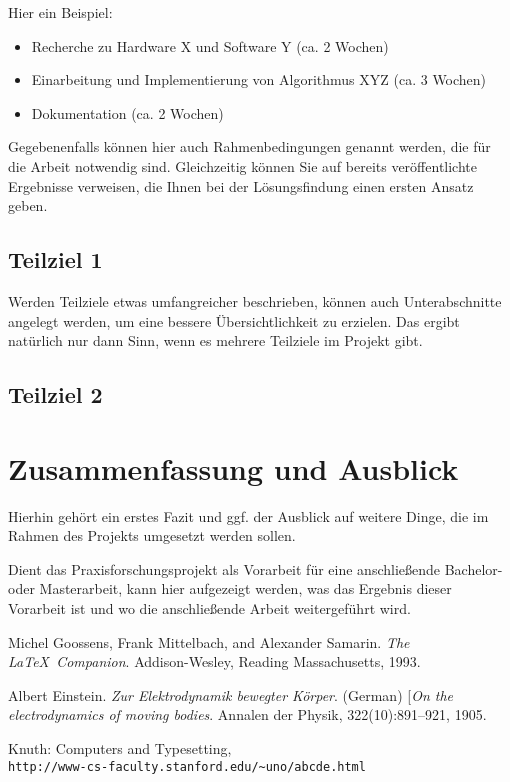 \documentclass[
  a4paper,	      %
	11pt,           %
  parskip=half*,  %
]{scrartcl}
\begin{document}
Hier ein Beispiel:

\begin{itemize}\tightlist
    \item Recherche zu Hardware X und Software Y (ca. 2 Wochen)
    \item Einarbeitung und Implementierung von Algorithmus XYZ (ca. 3 Wochen)
    \item Dokumentation (ca. 2 Wochen)
\end{itemize}

Gegebenenfalls können hier auch Rahmenbedingungen genannt werden, die für die Arbeit notwendig sind. Gleichzeitig können Sie auf bereits veröffentlichte Ergebnisse verweisen, die Ihnen bei der Lösungsfindung einen ersten Ansatz geben.

\subsection{Teilziel 1}
Werden Teilziele etwas umfangreicher beschrieben, können auch Unterabschnitte angelegt werden, um eine bessere Übersichtlichkeit zu erzielen. Das ergibt natürlich nur dann Sinn, wenn es mehrere Teilziele im Projekt gibt.

\subsection{Teilziel 2}

\section{Zusammenfassung und Ausblick}
Hierhin gehört ein erstes Fazit und ggf. der Ausblick auf weitere Dinge, die im Rahmen des Projekts umgesetzt werden sollen.

Dient das Praxisforschungsprojekt als Vorarbeit für eine anschließende Bachelor- oder Masterarbeit, kann hier aufgezeigt werden, was das Ergebnis dieser Vorarbeit ist und wo die anschließende Arbeit weitergeführt wird.

\begin{thebibliography}{1}

Michel Goossens, Frank Mittelbach, and Alexander Samarin. \textit{The \LaTeX\ Companion}. Addison-Wesley, Reading Massachusetts, 1993.

 Albert Einstein. \textit{Zur Elektrodynamik bewegter K{\"o}rper}. (German) [\textit{On the electrodynamics of moving bodies}. Annalen der Physik, 322(10):891–921, 1905.

 Knuth: Computers and Typesetting,\\ \texttt{http://www-cs-faculty.stanford.edu/\~{}uno/abcde.html}
\end{thebibliography}
\end{document}
